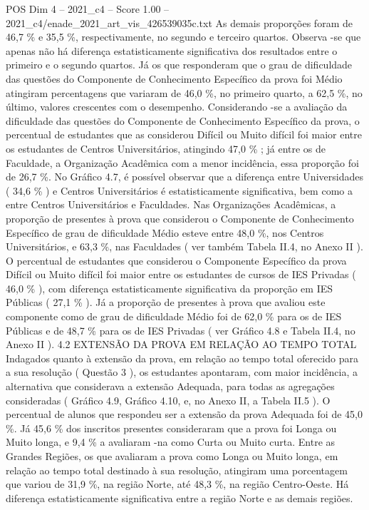 \begin{textsample}{POS Dim 4 – 2021\_c4 – Score 1.00 – 2021\_c4/enade\_2021\_art\_vis\_426539035c.txt}
As demais proporções foram de 46,7 \% e 35,5 \%, respectivamente, no segundo e terceiro quartos.
Observa -se que apenas não há diferença estatisticamente significativa dos resultados entre o primeiro e o segundo quartos.
Já os que responderam que o grau de dificuldade das questões do Componente de Conhecimento Específico da prova foi Médio atingiram percentagens que variaram de 46,0 \%, no primeiro quarto, a 62,5 \%, no último, valores crescentes com o desempenho.
Considerando -se a avaliação da dificuldade das questões do Componente de Conhecimento Específico da prova, o percentual de estudantes que as considerou Difícil ou Muito difícil foi maior entre os estudantes de Centros Universitários, atingindo 47,0 \% ; já entre os de Faculdade, a Organização Acadêmica com a menor incidência, essa proporção foi de 26,7 \%.
No Gráfico 4.7, é possível observar que a diferença entre Universidades ( 34,6 \% ) e Centros Universitários é estatisticamente significativa, bem como a entre Centros Universitários e Faculdades.
Nas Organizações Acadêmicas, a proporção de presentes à prova que considerou o Componente de Conhecimento Específico de grau de dificuldade Médio esteve entre 48,0 \%, nos Centros Universitários, e 63,3 \%, nas Faculdades ( ver também Tabela II.4, no Anexo II ).
O percentual de estudantes que considerou o Componente Específico da prova Difícil ou Muito difícil foi maior entre os estudantes de cursos de IES Privadas ( 46,0 \% ), com diferença estatisticamente significativa da proporção em IES Públicas ( 27,1 \% ).
Já a proporção de presentes à prova que avaliou este componente como de grau de dificuldade Médio foi de 62,0 \% para os de IES Públicas e de 48,7 \% para os de IES Privadas ( ver Gráfico 4.8 e Tabela II.4, no Anexo II ). 4.2 EXTENSÃO DA PROVA EM RELAÇÃO AO TEMPO TOTAL Indagados quanto à extensão da prova, em relação ao tempo total oferecido para a sua resolução ( Questão 3 ), os estudantes apontaram, com maior incidência, a alternativa que considerava a extensão Adequada, para todas as agregações consideradas ( Gráfico 4.9, Gráfico 4.10, e, no Anexo II, a Tabela II.5 ).
O percentual de alunos que respondeu ser a extensão da prova Adequada foi de 45,0 \%.
Já 45,6 \% dos inscritos presentes consideraram que a prova foi Longa ou Muito longa, e 9,4 \% a avaliaram -na como Curta ou Muito curta.
Entre as Grandes Regiões, os que avaliaram a prova como Longa ou Muito longa, em relação ao tempo total destinado à sua resolução, atingiram uma porcentagem que variou de 31,9 \%, na região Norte, até 48,3 \%, na região Centro-Oeste.
Há diferença estatisticamente significativa entre a região Norte e as demais regiões.

\end{textsample}
